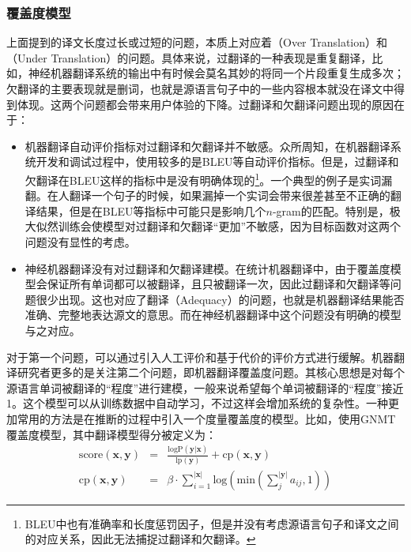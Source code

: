 \subsubsection{覆盖度模型}

\parinterval 上面提到的译文长度过长或过短的问题，本质上对应着{\small{}}（Over Translation）和{\small{}}（Under Translation）的问题。具体来说，过翻译的一种表现是重复翻译，比如，神经机器翻译系统的输出中有时候会莫名其妙的将同一个片段重复生成多次；欠翻译的主要表现就是删词，也就是源语言句子中的一些内容根本就没在译文中得到体现。这两个问题都会带来用户体验的下降。过翻译和欠翻译问题出现的原因在于：

\begin{itemize}
\vspace{0.5em}
\item 机器翻译自动评价指标对过翻译和欠翻译并不敏感。众所周知，在机器翻译系统开发和调试过程中，使用较多的是BLEU等自动评价指标。但是，过翻译和欠翻译在BLEU这样的指标中是没有明确体现的\footnote{BLEU中也有准确率和长度惩罚因子，但是并没有考虑源语言句子和译文之间的对应关系，因此无法捕捉过翻译和欠翻译。}。一个典型的例子是实词漏翻。在人翻译一个句子的时候，如果漏掉一个实词会带来很差甚至不正确的翻译结果，但是在BLEU等指标中可能只是影响几个$n$-gram的匹配。特别是，极大似然训练会使模型对过翻译和欠翻译``更加''不敏感，因为目标函数对这两个问题没有显性的考虑。
\vspace{0.5em}
\item 神经机器翻译没有对过翻译和欠翻译建模。在统计机器翻译中，由于覆盖度模型会保证所有单词都可以被翻译，且只被翻译一次，因此过翻译和欠翻译等问题很少出现。这也对应了翻译{\small{}}（Adequacy）的问题，也就是机器翻译结果能否准确、完整地表达源文的意思。而在神经机器翻译中这个问题没有明确的模型与之对应。
\vspace{0.5em}
\end{itemize}

\parinterval 对于第一个问题，可以通过引入人工评价和基于代价的评价方式进行缓解。机器翻译研究者更多的是关注第二个问题，即机器翻译覆盖度问题\cite{TuModeling}。其核心思想是对每个源语言单词被翻译的``程度''进行建模，一般来说希望每个单词被翻译的``程度''接近1。这个模型可以从训练数据中自动学习，不过这样会增加系统的复杂性。一种更加常用的方法是在推断的过程中引入一个度量覆盖度的模型。比如，使用GNMT覆盖度模型\cite{Wu2016GooglesNM}，其中翻译模型得分被定义为：
\begin{eqnarray}
\textrm{score}(\mathbf{x},\mathbf{y}) &=& \frac{\textrm{logP}(\mathbf{y} | \mathbf{x})}{\textrm{lp}(\mathbf{y})} + \textrm{cp}(\mathbf{x},\mathbf{y}) \\
\textrm{cp}(\mathbf{x},\mathbf{y}) &=& \beta \cdot \sum_{i=1}^{|\mathbf{x}|} \textrm{log}(\textrm{min} (\sum_{j}^{|\mathbf{y}|} a_{ij} , 1))
\label{eq:7-12}
\end{eqnarray}

